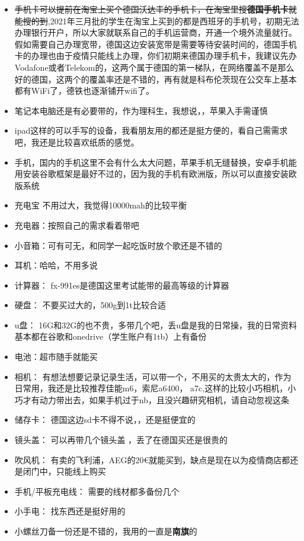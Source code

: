 \documentclass[doku]{subfiles}
\begin{document}
\begin{itemize}
	\item \sout{手机卡可以提前在淘宝上买个德国沃达丰的手机卡，在淘宝里搜\textbf{德国手机卡}就能搜的到},2021年三月批的学生在淘宝上买到的都是西班牙的手机号，初期无法办理银行开户，所以大家就联系自己的手机运营商，开通一个境外流量就行。假如需要自己办理宽带，德国这边安装宽带是需要等待安装时间的，德国手机卡的办理也由于疫情只能线上办理，你们初期来德国办理手机卡，我建议先办Vodafone或者Telekom的，这两个属于德国的第一梯队，在网络覆盖不是那么好的德国，这两个的覆盖率还是不错的，再有就是科布伦茨现在公交车上基本都有WiFi了，德铁也逐渐铺开wifi了。\label{simKarte}
	\item 笔记本电脑还是有必要带的，作为理科生，我想说，，苹果入手需谨慎
	\item ipad这样的可以手写的设备，我看朋友用的都还是挺方便的，看自己需需求吧，我还是比较喜欢纸质的感觉。
	\item 手机，国内的手机这里不会有什么太大问题，苹果手机无缝替换，安卓手机能用安装谷歌框架是最好不过的，因为我的手机有欧洲版，所以可以直接安装欧版系统
	\item 充电宝 不用过大，我觉得10000mah的比较平衡
	\item 充电器：按照自己的需求看着带吧
	\item 小音箱：可有可无，和同学一起吃饭时放个歌还是不错的
	\item 耳机：哈哈，不用多说
	\item 计算器： fx-991es是德国这里考试能带的最高等级的计算器
	\item 硬盘： 不要买过大的，500g到1t比较合适
	\item u盘： 16G和32G的也不贵，多带几个吧，丢u盘是我的日常操，我的日常资料基本都在谷歌和onedrive（学生账户有1tb）上有备份
	\item 电池：超市随手就能买
	\item 相机： 有想法想要记录记录生活，可以带一个，不用买的太贵太大的，作为日常用，我还是比较推荐佳能m6，索尼a6400， a7c,这样的比较小巧相机，小巧才有动力带出去，如果手机过于nb，且没兴趣研究相机，请自动忽视这条
	\item 储存卡： 德国这边sd卡不得不说，，还是挺便宜的
	\item 镜头盖： 可以再带几个镜头盖 ，丢了在德国买还是很贵的
	\item 吹风机： 有卖的飞利浦，AEG的20€就能买到，缺点是现在以为疫情商店都还是闭门中，只能线上购买
	\item 手机/平板充电线： 需要的线材都多备份几个
	\item 小手电： 找东西还是挺好用的
	\item 小螺丝刀备一份还是不错的，我用的一直是\textbf{南旗}的

\end{itemize}
\end{document}

